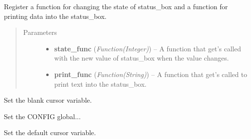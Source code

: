 \documentclass[letterpaper,10pt,english]{sphinxmanual}
\begin{document}
\begin{fulllineitems}
\label{diwavars:diwavars.register_status_box_callback}
Register a function for changing the state of status\_box and
a function for printing data into the status\_box.
\begin{quote}\begin{description}
\item[{Parameters}] \leavevmode\begin{itemize}
\item {} 
\textbf{state\_func} (\emph{Function(Integer)}) -- A function that get's called with the new value of status\_box when
the value changes.

\item {} 
\textbf{print\_func} (\emph{Function(String)}) -- A function that get's called to print text into the status\_box.

\end{itemize}

\end{description}\end{quote}

\end{fulllineitems}


\begin{fulllineitems}
\label{diwavars:diwavars.set_blank_cursor}
Set the blank cursor variable.

\end{fulllineitems}


\begin{fulllineitems}
\label{diwavars:diwavars.set_config}
Set the CONFIG global...

\end{fulllineitems}


\begin{fulllineitems}
\label{diwavars:diwavars.set_default_cursor}
Set the default cursor variable.

\end{fulllineitems}
\end{document}
